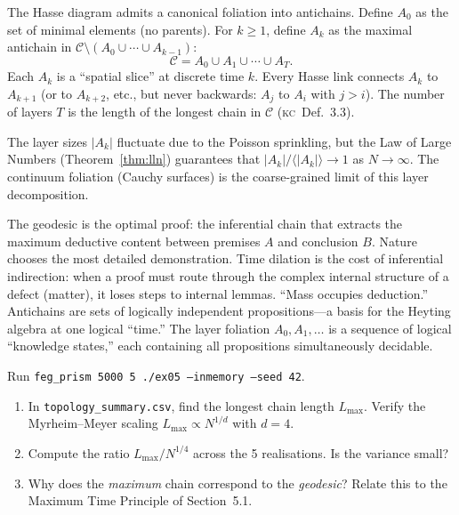 \documentclass[11pt, a4paper, openany]{book}
\newcommand{\KC}[1]{\textnormal{(\textsc{kc}~#1)}}
\newcounter{thm}[chapter]
\begin{document}
\begin{definition}\label{def:hasse-foliation}
The Hasse diagram admits a canonical foliation into antichains.
Define $A_0$ as the set of minimal elements (no parents). For
$k \ge 1$, define $A_k$ as the maximal antichain in
$\mathcal{C} \setminus (A_0 \cup \cdots \cup A_{k-1})$:
\[
  \mathcal{C} = A_0 \cup A_1 \cup \cdots \cup A_T.
\]
Each $A_k$ is a ``spatial slice'' at discrete time $k$. Every Hasse
link connects $A_k$ to $A_{k+1}$ (or to $A_{k+2}$, etc., but never
backwards: $A_j$ to $A_i$ with $j > i$). The number of layers $T$ is
the length of the longest chain in $\mathcal{C}$ \KC{Def.~3.3}.
\end{definition}

\noindent
The layer sizes $|A_k|$ fluctuate due to the Poisson sprinkling, but
the Law of Large Numbers (Theorem~\ref{thm:lln}) guarantees that
$|A_k|/\langle|A_k|\rangle \to 1$ as $N \to \infty$. The continuum
foliation (Cauchy surfaces) is the coarse-grained limit of this
layer decomposition.

\begin{logicalreading}
The geodesic is the optimal proof: the inferential chain that extracts
the maximum deductive content between premises $A$ and conclusion $B$.
Nature chooses the most detailed demonstration. Time dilation is the cost
of inferential indirection: when a proof must route through the complex
internal structure of a defect (matter), it loses steps to internal
lemmas. ``Mass occupies deduction.'' Antichains are sets of logically
independent propositions---a basis for the Heyting algebra at one
logical ``time.'' The layer foliation $A_0, A_1, \ldots$ is a sequence
of logical ``knowledge states,'' each containing all propositions
simultaneously decidable.
\end{logicalreading}


\begin{simulation}
Run \texttt{feg\_prism 5000 5 ./ex05 --inmemory --seed 42}.
\begin{enumerate}
\item In \texttt{topology\_summary.csv}, find the longest chain length $L_{\max}$. Verify the Myrheim--Meyer scaling $L_{\max} \propto N^{1/d}$ with $d = 4$.
\item Compute the ratio $L_{\max}/N^{1/4}$ across the 5 realisations. Is the variance small?
\item Why does the \emph{maximum} chain correspond to the \emph{geodesic}? Relate this to the Maximum Time Principle of Section~5.1.
\end{enumerate}
\end{simulation}
\end{document}
